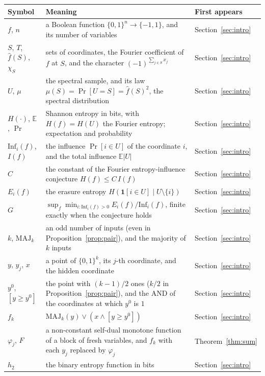 \documentclass[11pt]{amsart}
\theoremstyle{remark}
\newcommand{\Inf}{\mathrm{Inf}}
\newcommand{\E}{\mathbb{E}}
\newcommand{\MAJ}{\mathrm{MAJ}}
\begin{document}
\begin{longtable}{@{}>{\raggedright\arraybackslash}p{}>{\raggedright\arraybackslash}p{}>{\raggedright\arraybackslash}p{}@{}}
\toprule
Symbol & Meaning & First appears \\
\midrule
\endhead
$f$, $n$ & a Boolean function $\{0,1\}^n\to\{-1,1\}$, and its number of variables & Section~\ref{sec:intro} \\
$S$, $T$, $\hat f(S)$, $\chi_S$ & sets of coordinates, the Fourier coefficient of $f$ at $S$, and the character $(-1)^{\sum_{j\in S}x_j}$ & Section~\ref{sec:intro} \\
$U$, $\mu$ & the spectral sample, and its law $\mu(S)=\Pr[U=S]=\hat f(S)^2$, the spectral distribution & Section~\ref{sec:intro} \\
$H(\cdot)$, $\E$, $\Pr$ & Shannon entropy in bits, with $H(f)=H(U)$ the Fourier entropy; expectation and probability & Section~\ref{sec:intro} \\
$\Inf_i(f)$, $I(f)$ & the influence $\Pr[i\in U]$ of the coordinate $i$, and the total influence $\E|U|$ & Section~\ref{sec:intro} \\
$C$ & the constant of the Fourier entropy-influence conjecture $H(f)\le C\,I(f)$ & Section~\ref{sec:intro} \\
$E_i(f)$ & the erasure entropy $H(\mathbf 1[i\in U]\mid U\setminus\{i\})$ & Section~\ref{sec:intro} \\
$G$ & $\sup_f\min_{i:\Inf_i(f)>0}E_i(f)/\Inf_i(f)$, finite exactly when the conjecture holds & Section~\ref{sec:intro} \\
$k$, $\MAJ_k$ & an odd number of inputs (even in Proposition~\ref{prop:pair}), and the majority of $k$ inputs & Section~\ref{sec:intro} \\
$y$, $y_j$, $x$ & a point of $\{0,1\}^k$, its $j$-th coordinate, and the hidden coordinate & Section~\ref{sec:intro} \\
$y^0$, $[y\ge y^0]$ & the point with $(k-1)/2$ ones ($k/2$ in Proposition~\ref{prop:pair}), and the AND of the coordinates at which $y^0$ is $1$ & Section~\ref{sec:intro} \\
$f_k$ & $\MAJ_k(y)\vee(x\wedge[y\ge y^0])$ & Section~\ref{sec:intro} \\
$\varphi_j$, $F$ & a non-constant self-dual monotone function of a block of fresh variables, and $f_k$ with each $y_j$ replaced by $\varphi_j$ & Theorem~\ref{thm:sum} \\
$h_2$ & the binary entropy function in bits & Section~\ref{sec:intro} \\

\end{longtable}
\end{document}
